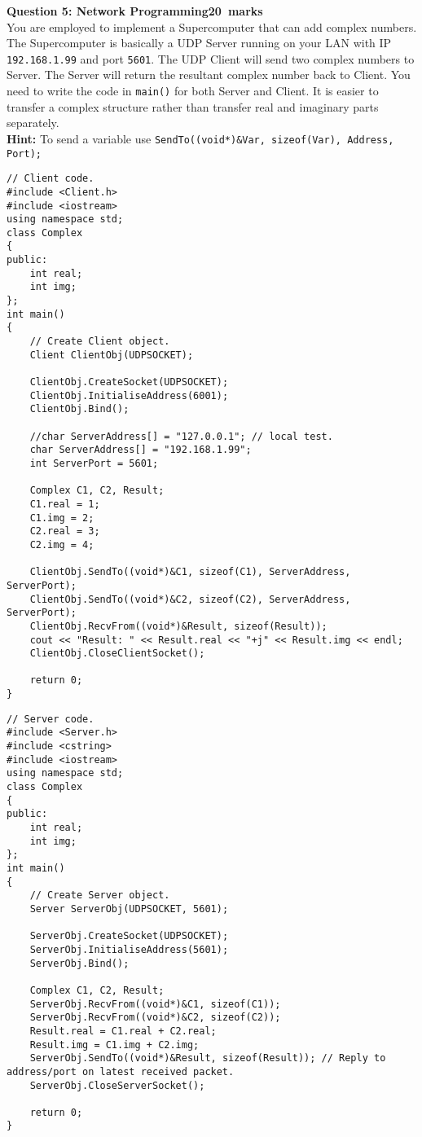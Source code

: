 \documentclass[12pt,a4paper]{article}
\def\Qfive{20}
\begin{document}
\noindent\textbf{Question 5: Network Programming\hfill \Qfive~marks}\\
You are employed to implement a Supercomputer that can add complex numbers. The Supercomputer is basically a UDP Server running on your LAN with IP \verb|192.168.1.99| and port \verb|5601|. The UDP Client will send two complex numbers to Server. The Server will return the resultant complex number back to Client. You need to write the code in \verb|main()| for both Server and Client. It is easier to transfer a complex structure rather than transfer real and imaginary parts separately.\\
\textbf{Hint:} To send a variable use \verb|SendTo((void*)&Var, sizeof(Var), Address, Port);|
\begin{lstlisting}
// Client code.
#include <Client.h>
#include <iostream>
using namespace std;
class Complex
{
public:
	int real;
	int img;
};
int main()
{
	// Create Client object.
	Client ClientObj(UDPSOCKET);

	ClientObj.CreateSocket(UDPSOCKET);
	ClientObj.InitialiseAddress(6001);
	ClientObj.Bind();

	//char ServerAddress[] = "127.0.0.1"; // local test.
	char ServerAddress[] = "192.168.1.99";
	int ServerPort = 5601;

	Complex C1, C2, Result;
	C1.real = 1;
	C1.img = 2;
	C2.real = 3;
	C2.img = 4;

	ClientObj.SendTo((void*)&C1, sizeof(C1), ServerAddress, ServerPort);
	ClientObj.SendTo((void*)&C2, sizeof(C2), ServerAddress, ServerPort);
	ClientObj.RecvFrom((void*)&Result, sizeof(Result));
	cout << "Result: " << Result.real << "+j" << Result.img << endl;
	ClientObj.CloseClientSocket();

	return 0;
}
\end{lstlisting}
\begin{lstlisting}
// Server code.
#include <Server.h>
#include <cstring>
#include <iostream>
using namespace std;
class Complex
{
public:
	int real;
	int img;
};
int main()
{
	// Create Server object.
	Server ServerObj(UDPSOCKET, 5601);

	ServerObj.CreateSocket(UDPSOCKET);
	ServerObj.InitialiseAddress(5601);
	ServerObj.Bind();

	Complex C1, C2, Result;
	ServerObj.RecvFrom((void*)&C1, sizeof(C1));
	ServerObj.RecvFrom((void*)&C2, sizeof(C2));
	Result.real = C1.real + C2.real;
	Result.img = C1.img + C2.img;
	ServerObj.SendTo((void*)&Result, sizeof(Result)); // Reply to address/port on latest received packet.
	ServerObj.CloseServerSocket();

	return 0;
}
\end{lstlisting}
\end{document}
